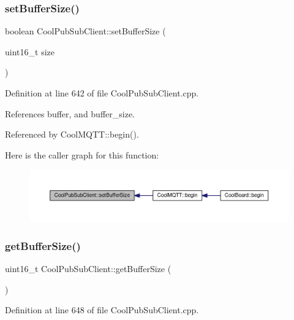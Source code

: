 \subsubsection{\texorpdfstring{set\+Buffer\+Size()}{setBufferSize()}}
{\footnotesize\ttfamily boolean Cool\+Pub\+Sub\+Client\+::set\+Buffer\+Size (\begin{DoxyParamCaption}\item[{uint16\+\_\+t}]{size }\end{DoxyParamCaption})}



Definition at line 642 of file Cool\+Pub\+Sub\+Client.\+cpp.



References buffer, and buffer\+\_\+size.



Referenced by Cool\+M\+Q\+T\+T\+::begin().

Here is the caller graph for this function\+:\nopagebreak
\begin{figure}[H]
\begin{center}
\leavevmode
\includegraphics[width=350pt]{d8/d4b/class_cool_pub_sub_client_a4f83e54f1ba96e32f725d93cdec283b7_icgraph}
\end{center}
\end{figure}
\mbox{\label{class_cool_pub_sub_client_ac3c8bf1daed573d1ffa8b5c1fcb13f98}} 
\subsubsection{\texorpdfstring{get\+Buffer\+Size()}{getBufferSize()}}
{\footnotesize\ttfamily uint16\+\_\+t Cool\+Pub\+Sub\+Client\+::get\+Buffer\+Size (\begin{DoxyParamCaption}{ }\end{DoxyParamCaption})}



Definition at line 648 of file Cool\+Pub\+Sub\+Client.\+cpp.



